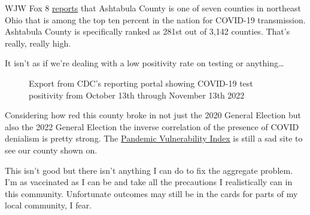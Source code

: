 WJW Fox 8
\href{https://web.archive.org/web/20221116194151/https://fox8.com/news/coronavirus/7-ne-ohio-counties-have-some-of-the-highest-coronavirus-spread-in-the-u-s-right-now/}{reports}
that Ashtabula County is one of seven counties in northeast Ohio that is
among the top ten percent in the nation for COVID-19 transmission.
Ashtabula County is specifically ranked as 281st out of 3,142 counties.
That's really, really high.

It isn't as if we're dealing with a low positivity rate on testing or
anything\ldots{}

\begin{figure}
\centering
{}
\caption{Export from CDC's reporting portal showing COVID-19 test
positivity from October 13th through November 13th 2022}
\end{figure}

Considering how red this county broke in not just the 2020 General
Election but also the 2022 General Election the inverse correlation of
the presence of COVID denialism is pretty strong. The
\href{https://covid19pvi.niehs.nih.gov/}{Pandemic Vulnerability Index}
is still a sad site to see our county shown on.

This isn't good but there isn't anything I can do to fix the aggregate
problem. I'm as vaccinated as I can be and take all the precautions I
realistically can in this community. Unfortunate outcomes may still be
in the cards for parts of my local community, I fear.
